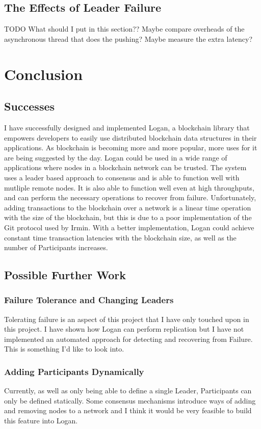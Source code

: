 \documentclass[12pt,a4paper,twoside,openright]{report}
\begin{document}
	\section{The Effects of Leader Failure}

	TODO  What should I put in this section??
	Maybe compare overheads of the asynchronous thread that does the pushing?
	Maybe measure the extra latency?

	\chapter{Conclusion}
	\section{Successes}
	I have successfully designed and implemented Logan, a blockchain library that empowers developers to easily use distributed blockchain data structures in their applications.
	As blockchain is becoming more and more popular, more uses for it are being suggested by the day. 
	Logan could be used in a wide range of applications where nodes in a blockchain network can be trusted. 
	The system uses a leader based approach to consensus and is able to function well with mutliple remote nodes. 
	It is also able to function well even at high throughputs, and can perform the necessary operations to recover from failure.
	Unfortunately, adding transactions to the blockchain over a network is a linear time operation with the size of the blockchain, but this is due to a poor implementation of the Git protocol used by Irmin. 
	With a better implementation, Logan could achieve constant time transaction latencies with the blockchain size, as well as the number of Participants increases.


	\section{Possible Further Work}
	\subsection{Failure Tolerance and Changing Leaders}
	Tolerating failure is an aspect of this project that I have only touched upon in this project. 
	I have shown how Logan can perform replication but I have not implemented an automated approach for detecting and recovering from Failure. 
	This is something I'd like to look into.
	\subsection{Adding Participants Dynamically}
	Currently, as well as only being able to define a single Leader, Participants can only be defined statically. 
	Some consensus mechanisms introduce ways of adding and removing nodes to a network and I think it would be very feasible to build this feature into Logan.
\end{document}
